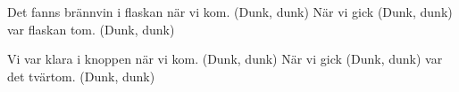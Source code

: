 \begin{song}

\begin{songmeta}
\end{songmeta}

\begin{songtext}
Det fanns brännvin i flaskan när vi kom.
(Dunk, dunk)
När vi gick
(Dunk, dunk)
var flaskan tom.
(Dunk, dunk)

Vi var klara i knoppen när vi kom.
(Dunk, dunk)
När vi gick
(Dunk, dunk)
var det tvärtom.
(Dunk, dunk)
\end{songtext}
\end{song}
